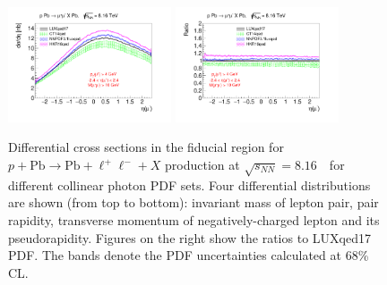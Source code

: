 \begin{figure}[]
\includegraphics[width=0.43\textwidth]{figures/etal_inc_cut.pdf}
\includegraphics[width=0.43\textwidth]{figures/Ratioetal_inc_cut.pdf}
\caption{Differential cross sections in the fiducial region for $p+\textrm{Pb}\rightarrow \textrm{Pb} + \ell^+\ell^- + X$ production at $\sqrt{s_{N N}} = 8.16$~\TeV\ for different collinear photon PDF sets.
Four differential distributions are shown (from top to bottom): invariant mass of lepton pair, pair rapidity, transverse momentum of negatively-charged lepton and its pseudorapidity. Figures on the right show the ratios to LUXqed17 PDF. The bands denote the PDF uncertainties calculated at 68\% CL.}
\label{fig:inc_cut}
\end{figure}






